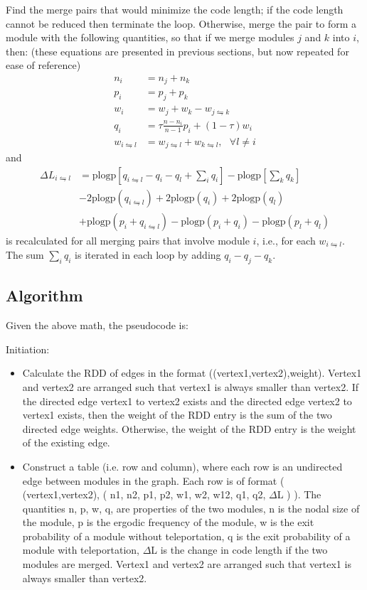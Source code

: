 \documentclass[12pt,a4paper]{article}
\begin{document}
Find the merge pairs that would minimize the code length; if the code length cannot be reduced then terminate the loop. Otherwise, merge the pair to form a module with the following quantities, so that if we merge modules \(j\) and \(k\) into \(i\), then: (these equations are presented in previous sections, but now repeated for ease of reference)
\begin{align*}
    n_i &= n_j +n_k \\
    p_i &= p_j +p_k \\
    w_i &= w_j +w_k -w_{j\leftrightharpoons k} \\
    q_i &= \tau\frac{n-n_i}{n-1}p_i +(1-\tau)w_i \\
    w_{i\leftrightharpoons l} &= w_{j\leftrightharpoons l} +w_{k\leftrightharpoons l}, ~~~\forall l\neq i
\end{align*}
and
\begin{align}
    \Delta L_{i\leftrightharpoons l} &= \mathrm{plogp}\left[ q_{i\leftrightharpoons l}-q_i-q_l+\sum_i q_i \right] -\mathrm{plogp} \left[ \sum_k q_k \right] \nonumber\\
    &-2 \mathrm{plogp}(q_{i\leftrightharpoons l}) +2\mathrm{plogp}(q_i) +2\mathrm{plogp}(q_l) \nonumber\\
    &+\mathrm{plogp}(p_i+q_{i\leftrightharpoons l}) -\mathrm{plogp}(p_i+q_i) -\mathrm{plogp}(p_l+q_l)
\end{align}
    is recalculated for all merging pairs that involve module \(i\), i.e., for each \(w_{i\leftrightharpoons l}\). The sum \(\sum_iq_i\) is iterated in each loop by adding \(q_i-q_j-q_k\).

\subsection{Algorithm}

Given the above math, the pseudocode is:

Initiation:
\begin{itemize}
    \item Calculate the RDD of edges in the format ((vertex1,vertex2),weight). Vertex1 and vertex2 are arranged such that vertex1 is always smaller than vertex2. If the directed edge vertex1 to vertex2 exists and the directed edge vertex2 to vertex1 exists, then the weight of the RDD entry is the sum of the two directed edge weights. Otherwise, the weight of the RDD entry is the weight of the existing edge.
    \item Construct a table (i.e. row and column), where each row is an undirected edge between modules in the graph. Each row is of format ( (vertex1,vertex2), ( n1, n2, p1, p2, w1, w2, w12, q1, q2, \(\Delta\)L ) ). The quantities n, p, w, q, are properties of the two modules, n is the nodal size of the module, p is the ergodic frequency of the module, w is the exit probability of a module without teleportation, q is the exit probability of a module with teleportation, \(\Delta\)L is the change in code length if the two modules are merged. Vertex1 and vertex2 are arranged such that vertex1 is always smaller than vertex2.
\end{itemize}
\end{document}
